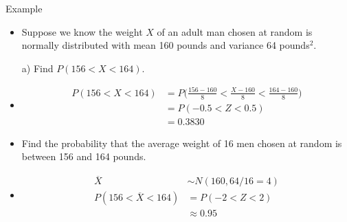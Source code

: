 \documentclass[10pt, handout, xcolor=table]{beamer}
\begin{document}
\begin{frame}{Example}
\begin{itemize}
\item Suppose we know the weight $X$ of an adult man chosen at random is normally distributed with mean 160 pounds and variance 64 pounds$^2$. \\[10pt]
\item[a)] Find $P(156 < X < 164)$.
\item<2->[] {\color{red} 
\vspace*{-0.25cm}
\begin{align*}
P(156 < X < 164) &= P\bigg(\frac{156-160}{8} < \frac{X - 160}{8} < \frac{164-160}{8}\bigg) \\
&= P(-0.5 < Z < 0.5) \\
&=  0.3830
\end{align*}}
\vspace*{-0.25cm}
\item<3->[b)] Find the probability that the average weight of 16 men chosen at random is between 156 and 164 pounds.
\vspace*{-0.25cm}
\item<4->[] \color{red}
\begin{align*}
\overline{X} &\sim N(160, 64/16 = 4) \\
P(156 < \overline{X} < 164) &= P(-2 < Z < 2)\\
&\approx 0.95
\end{align*}
\end{itemize}
\end{frame}
\end{document}
